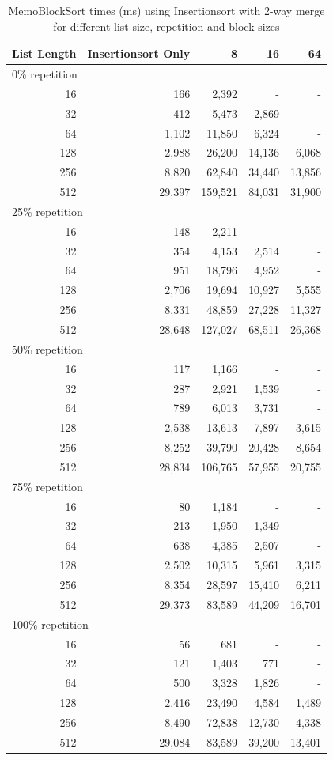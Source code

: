 \documentclass[a4paper,12pt]{article}
\begin{document}

\begin{table}[H]
\centering
\begin{tabular}{|r|r|r|r|r|}   \hline
	{List Length} & {Insertionsort Only} & {8} & {16} & {64} \\  \hline
	\multicolumn{5}{|l|}{ 0\% repetition} \\ \hline
	16 &166&2,392&- & - \\ 
	32 &412&5,473&2,869 & -\\ 
	64 &1,102&11,850 & 6,324 &-\\ 
	128 &2,988&26,200&14,136&6,068\\ 
	256 &8,820&62,840&34,440&13,856\\ 
	512 &29,397& 159,521&84,031&31,900\\  \hline
	\multicolumn{5}{|l|}{ 25\% repetition} \\ \hline
	16 &148&2,211&- & - \\ 
	32 &354&4,153&2,514 & -\\ 
	64 &951&18,796 & 4,952&-\\ 
	128 &2,706&19,694&10,927&5,555\\ 
	256 &8,331&48,859&27,228&11,327\\ 
	512 &28,648&127,027&68,511&26,368\\  \hline
	\multicolumn{5}{|l|}{ 50\% repetition} \\ \hline
	16 &117&1,166&- & - \\ 
	32 &287&2,921&1,539 & -\\ 
	64 &789&6,013 & 3,731&-\\ 
	128 &2,538&13,613&7,897&3,615\\ 
	256 &8,252&39,790&20,428&8,654\\ 
	512 &28,834&106,765&57,955&20,755\\  \hline
	\multicolumn{5}{|l|}{ 75\% repetition} \\ \hline
	16 &80&1,184&- & - \\ 
	32 &213&1,950&1,349 & -\\ 
	64 &638&4,385& 2,507&-\\ 
	128 &2,502&10,315&5,961&3,315\\ 
	256 &8,354&28,597&15,410&6,211\\ 
	512 &29,373&83,589&44,209&16,701\\  \hline
	\multicolumn{5}{|l|}{ 100\% repetition} \\ \hline
	16 &56&681&- & - \\ 
	32 &121&1,403&771 & -\\ 
	64 &500&3,328& 1,826&-\\ 
	128 &2,416&23,490&4,584&1,489\\ 
	256 &8,490&72,838&12,730&4,338\\ 
	512 &29,084&83,589&39,200&13,401\\  \hline
\end{tabular}
\caption{MemoBlockSort times (ms) using Insertionsort with 2-way merge for different list size, repetition and block sizes}
\end{table}
\end{document}
